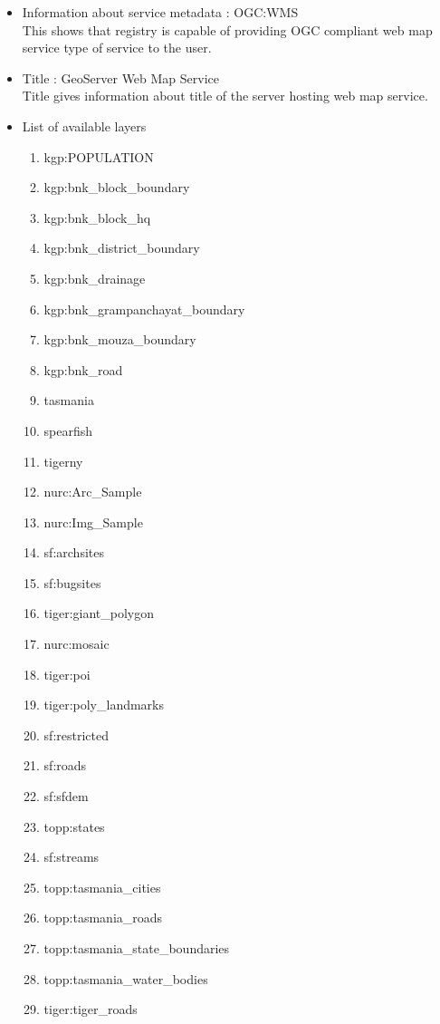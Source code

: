 \begin{itemize}

\item Information about service metadata : OGC:WMS\\
This shows that registry is capable of providing OGC compliant web map service type of service to the user.\\

\item Title : GeoServer Web Map Service\\
Title gives information about title of the server hosting web map service.

\item List of available layers
\begin{enumerate}
\item kgp:POPULATION 
\item kgp:bnk\_block\_boundary 
\item kgp:bnk\_block\_hq 
\item kgp:bnk\_district\_boundary 
\item kgp:bnk\_drainage 
\item kgp:bnk\_grampanchayat\_boundary 
\item kgp:bnk\_mouza\_boundary 
\item kgp:bnk\_road
\item tasmania
\item spearfish
\item tiger\-ny
\item nurc:Arc\_Sample
\item nurc:Img\_Sample
\item sf:archsites
\item sf:bugsites
\item tiger:giant\_polygon
\item nurc:mosaic
\item tiger:poi
\item tiger:poly\_landmarks
\item sf:restricted
\item sf:roads
\item sf:sfdem
\item topp:states
\item sf:streams
\item topp:tasmania\_cities
\item topp:tasmania\_roads
\item topp:tasmania\_state\_boundaries
\item topp:tasmania\_water\_bodies
\item tiger:tiger\_roads
\end{enumerate}


\end{itemize}
